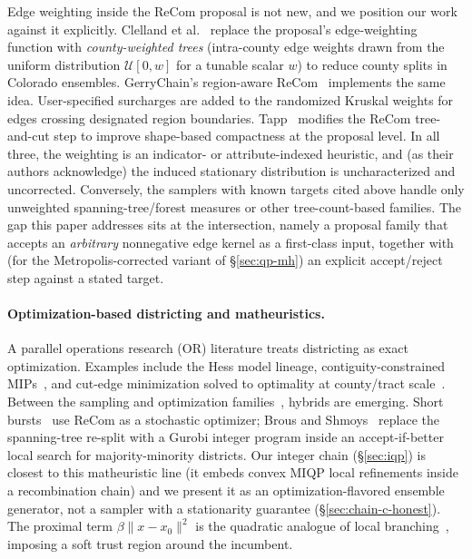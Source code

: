\documentclass[11pt]{article}
\begin{document}
Edge weighting inside the ReCom proposal is not new, and we position
our work against it explicitly. Clelland et
al.~\cite{clelland2022colorado} replace the proposal's edge-weighting
function with \emph{county-weighted trees} (intra-county edge
weights drawn from the uniform distribution $\mathcal{U}[0, w]$ for a tunable scalar $w$) to reduce county splits in Colorado ensembles. GerryChain's
region-aware ReCom~\cite{gerrychain2024} implements the same idea.
User-specified surcharges are added to the randomized Kruskal weights
for edges crossing designated region boundaries. Tapp~\cite{tapp2025compactness}
modifies the ReCom tree-and-cut step to improve shape-based
compactness at the proposal level. In all three, the weighting is an
indicator- or attribute-indexed heuristic, and (as their authors
acknowledge) the induced stationary distribution is uncharacterized
and uncorrected. Conversely, the samplers with known targets cited
above handle only unweighted spanning-tree/forest measures or other
tree-count-based families. The gap this paper addresses sits at the
intersection, namely a proposal family that accepts an \emph{arbitrary}
nonnegative edge kernel as a first-class input, together with (for the
Metropolis-corrected variant of \S\ref{sec:qp-mh}) an explicit
accept/reject step against a stated target.

\paragraph{Optimization-based districting and matheuristics.}\label{sec:related-opt}

A parallel operations research (OR) literature treats districting as
exact optimization. Examples include the Hess model lineage, contiguity-constrained
MIPs~\cite{validi2022imposing}, and cut-edge minimization solved to
optimality at county/tract scale~\cite{validi2022political}. Between
the sampling and optimization families~\cite{becker2022redistricting},
hybrids are emerging. Short bursts~\cite{cannon2023voting} use ReCom
as a stochastic optimizer; Brous and Shmoys~\cite{brous2025recom}
replace the spanning-tree re-split with a Gurobi integer program
inside an accept-if-better local search for majority-minority
districts. Our integer chain (\S\ref{sec:iqp}) is closest to this
matheuristic line (it embeds convex MIQP local refinements inside a
recombination chain) and we present it as an
optimization-flavored ensemble generator, not a sampler with a
stationarity guarantee (\S\ref{sec:chain-c-honest}). The proximal
term $\beta\|x - x_0\|^2$ is the quadratic analogue of local
branching~\cite{fischetti2003local}, imposing a soft trust region
around the incumbent.
\end{document}
